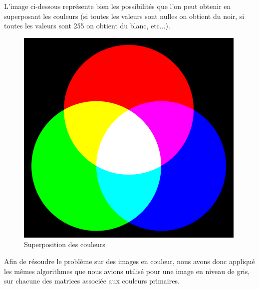  L'image ci-dessous représente bien les possibilités que l'on peut obtenir en superposant les couleurs (si toutes les valeurs sont nulles on obtient du noir, si toutes les valeurs sont 255 on obtient du blanc, etc...).
 
 \begin{figure}[H]
 \centering
 \includegraphics[scale=0.3]{Images/RGB.png}
 \caption{Superposition des couleurs}
  \end{figure}
 
Afin de résoudre le problème sur des images en couleur, nous avons donc appliqué les mêmes algorithmes que nous avions utilisé pour une image en niveau de gris, sur chacune des matrices associée aux couleurs primaires.\newline
 
